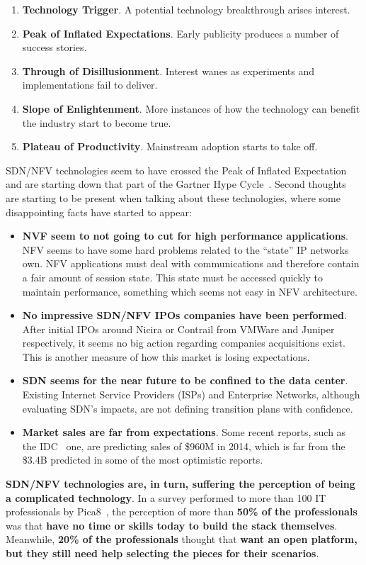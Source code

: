 \documentclass[a4paper, 12pt]{book}
\begin{document}
\begin{enumerate}\itemsep0pt
\item{\textbf{Technology Trigger}}. A potential technology breakthrough arises interest.
\item{\textbf{Peak of Inflated Expectations}}. Early publicity produces a number of success stories.
\item{\textbf{Through of Disillusionment}}. Interest wanes as experiments and implementations fail to deliver.
\item{\textbf{Slope of Enlightenment}}. More instances of how the technology can benefit the industry start to become true.
\item{\textbf{Plateau of Productivity}}. Mainstream adoption starts to take off.
\end{enumerate}
SDN/NFV technologies seem to have crossed the Peak of Inflated Expectation and are starting down that part of the Gartner Hype Cycle~\cite{SDNandNFVHypeCycle}. Second thoughts are starting to be present when talking about these technologies, where some disappointing facts have started to appear:
\begin{itemize}\itemsep0pt
\item{\textbf{NVF seem to not going to cut for high performance applications}}. NFV seems to have some hard problems related to the ``state'' IP networks own. NFV applications must deal with communications and therefore contain a fair amount of session state. This state must be accessed quickly to maintain performance, something which seems not easy in NFV architecture.
\item{\textbf{No impressive SDN/NFV IPOs companies have been performed}}. After initial IPOs around Nicira or Contrail from VMWare and Juniper respectively, it seems no big action regarding companies acquisitions exist. This is another measure of how this market is losing expectations.
\item{\textbf{SDN seems for the near future to be confined to the data center}}. Existing Internet Service Providers (ISPs) and Enterprise Networks, although evaluating SDN's impacts, are not defining transition plans with confidence.
\item{\textbf{Market sales are far from expectations}}. Some recent reports, such as the IDC~\cite{SDNMarket20142018IDC} one, are predicting sales of \$960M in 2014, which is far from the \$3.4B predicted in some of the most optimistic reports.
\end{itemize}
\textbf{SDN/NFV technologies are, in turn, suffering the perception of being a complicated technology}. In a survey performed to more than 100 IT professionals by Pica8~\cite{Pica8Survey}, the perception of more than \textbf{50\% of the professionals} was that \textbf{have no time or skills today to build the stack themselves}. Meanwhile, \textbf{20\% of the professionals} thought that \textbf{want an open platform, but they still need help selecting the pieces for their scenarios}.\\
\end{document}
